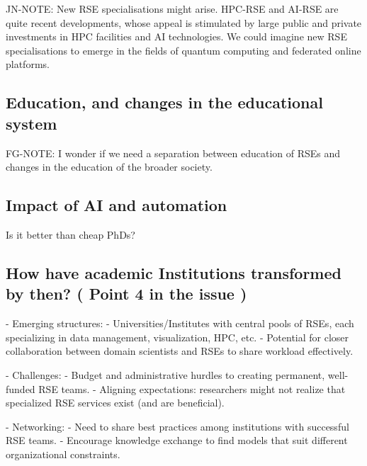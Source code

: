 \documentclass{eceasst}
\begin{document}
\begin{FramedParagraphWithFootnotes}
JN-NOTE:
New RSE specialisations might arise.
HPC-RSE and AI-RSE are quite recent developments,
whose appeal is stimulated by large public and private
investments in HPC facilities and AI technologies.
We could imagine new RSE specialisations to emerge in the fields
of quantum computing and federated online platforms.
\end{FramedParagraphWithFootnotes}


\subsection{Education, and changes in the educational system}
FG-NOTE: I wonder if we need a separation between education of RSEs and changes in the education of the broader society.

\subsection{Impact of AI and automation}
Is it better than cheap PhDs?

\subsection{How have academic Institutions transformed by then? ( Point 4 in the issue )}
- Emerging structures:
  - Universities/Institutes with central pools of RSEs, each specializing in data management, visualization, HPC, etc.
  - Potential for closer collaboration between domain scientists and RSEs to share workload effectively.

- Challenges:
  - Budget and administrative hurdles to creating permanent, well-funded RSE teams.
  - Aligning expectations: researchers might not realize that specialized RSE services exist (and are beneficial).

- Networking:
  - Need to share best practices among institutions with successful RSE teams.
  - Encourage knowledge exchange to find models that suit different organizational constraints.
\end{document}
